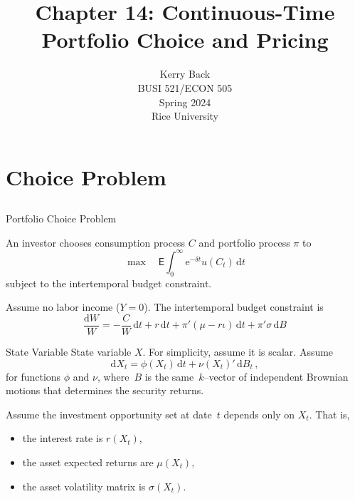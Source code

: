 \documentclass[10pt]{beamer}
\title{Chapter 14: Continuous-Time Portfolio Choice and Pricing}
\date{}
\author{Kerry Back\\ 
BUSI 521/ECON 505\\
Spring 2024\\
Rice University}
\newcommand{\D}{\mathrm{d}}
\newcommand{\E}{\mathrm{e}}
\newcommand{\mye}{\ensuremath{\mathsf{E}}}
\begin{document}
\maketitle

\section{Choice Problem}\subsection{}

\begin{frame}{Portfolio Choice Problem}

An investor chooses consumption process $C$ and portfolio process $\pi$ to 
$$\max \quad \mye \int_0^\infty \E^{-\delta t}u(C_t)\,\D t$$
subject to the intertemporal budget constraint.

 Assume no labor income ($Y=0$).  The intertemporal budget constraint is
$$\frac{\D W}{W} = -\frac{C}{W}\,\D t + r\,\D t+\pi'(\mu-r\iota)\,\D t + \pi'\sigma\,\D B$$

\end{frame}


\begin{frame}{State Variable}
  State variable $X$.  For simplicity, assume it is scalar.  
 Assume 
$$
	\D X_t = \phi(X_t)\,\D t + \nu(X_t)'\,\D B_t\,,
$$
for functions $\phi$ and $\nu$, where~$B$ is the same~$k$--vector of independent Brownian motions that determines the security 
returns.

 Assume the investment opportunity set at date~$t$ depends only on $X_t$.  That is,

\begin{itemize}
    \item  the interest rate is $r(X_t)$,
\item the asset expected returns are $\mu(X_t)$,
\item the asset volatility matrix is $\sigma(X_t)$.
\end{itemize}
\end{frame}
\end{document}
